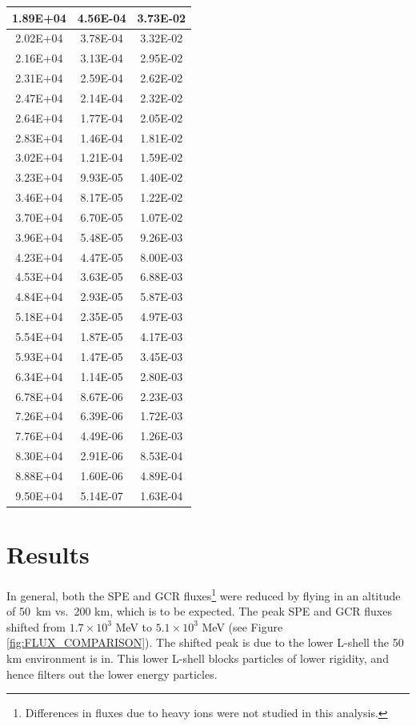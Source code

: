 \documentclass{hitec}
\begin{document}
\begin{table}[h]
{\begin{tabular}{|c|c|c|}
			1.89E+04&	4.56E-04&	3.73E-02\\ \hline
			2.02E+04&	3.78E-04&	3.32E-02\\ \hline
			2.16E+04&	3.13E-04&	2.95E-02\\ \hline
			2.31E+04&	2.59E-04&	2.62E-02\\ \hline
			2.47E+04&	2.14E-04&	2.32E-02\\ \hline
			2.64E+04&	1.77E-04&	2.05E-02\\ \hline
			2.83E+04&	1.46E-04&	1.81E-02\\ \hline
			3.02E+04&	1.21E-04&	1.59E-02\\ \hline
			3.23E+04&	9.93E-05&	1.40E-02\\ \hline
			3.46E+04&	8.17E-05&	1.22E-02\\ \hline
			3.70E+04&	6.70E-05&	1.07E-02\\ \hline
			3.96E+04&	5.48E-05&	9.26E-03\\ \hline
			4.23E+04&	4.47E-05&	8.00E-03\\ \hline
			4.53E+04&	3.63E-05&	6.88E-03\\ \hline
			4.84E+04&	2.93E-05&	5.87E-03\\ \hline
			5.18E+04&	2.35E-05&	4.97E-03\\ \hline
			5.54E+04&	1.87E-05&	4.17E-03\\ \hline
			5.93E+04&	1.47E-05&	3.45E-03\\ \hline
			6.34E+04&	1.14E-05&	2.80E-03\\ \hline
			6.78E+04&	8.67E-06&	2.23E-03\\ \hline
			7.26E+04&	6.39E-06&	1.72E-03\\ \hline
			7.76E+04&	4.49E-06&	1.26E-03\\ \hline
			8.30E+04&	2.91E-06&	8.53E-04\\ \hline
			8.88E+04&	1.60E-06&	4.89E-04\\ \hline
			9.50E+04&	5.14E-07&	1.63E-04\\ \hline
		\end{tabular}%
	}
\end{table}


\section{Results}
In general, both the SPE and GCR fluxes\footnote{Differences in fluxes due to heavy ions were not studied in this analysis.} were reduced by flying in an altitude of 50~km vs.\ 200 km, which is to be expected. The peak SPE and GCR fluxes shifted from $1.7\times 10^3$ MeV to $5.1\times 10^3$ MeV (see Figure \ref{fig:FLUX_COMPARISON}). The shifted peak is due to the lower L-shell the 50 km environment is in. This lower L-shell blocks particles of lower rigidity, and hence filters out the lower energy particles.
\end{document}
